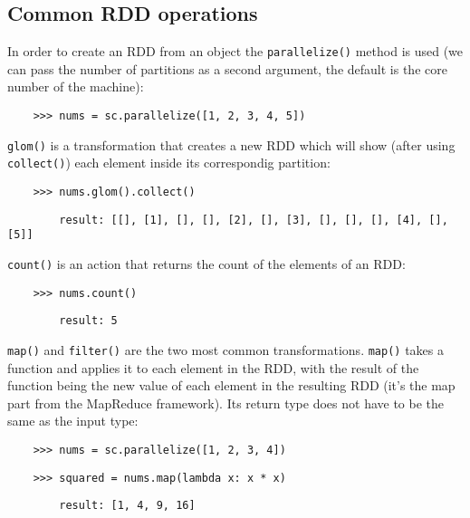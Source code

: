 \subsection{Common RDD operations}


In order to create an RDD from an object the \texttt{parallelize()} method is used (we can pass the number of partitions as a second argument, the default is the core number of the machine):

\begin{lstlisting}
    >>> nums = sc.parallelize([1, 2, 3, 4, 5])
\end{lstlisting}


\texttt{glom()} is a transformation that creates a new RDD which will show (after using \texttt{collect()}) each element inside its correspondig partition:

\begin{lstlisting}
    >>> nums.glom().collect()
\end{lstlisting}

\begin{lstlisting}
        result: [[], [1], [], [], [2], [], [3], [], [], [], [4], [], [5]]
\end{lstlisting}


\texttt{count()} is an action that returns the count of the elements of an RDD:

\begin{lstlisting}
    >>> nums.count()
\end{lstlisting}

\begin{lstlisting}
        result: 5
\end{lstlisting}


\texttt{map()} and \texttt{filter()} are the two most common transformations. \texttt{map()} takes a function and applies it to each element in the RDD, with the result of the function being the new value of each element in the resulting RDD (it's the map part from the MapReduce framework). Its return type does not have to be the same as the input type:

\begin{lstlisting}
    >>> nums = sc.parallelize([1, 2, 3, 4])
\end{lstlisting}

\begin{lstlisting}
    >>> squared = nums.map(lambda x: x * x)
\end{lstlisting}

\begin{lstlisting}
        result: [1, 4, 9, 16]
\end{lstlisting}

